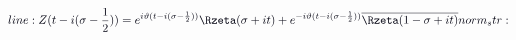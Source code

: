 \documentclass[12pt]{article}
\begin{document}
\makeatletter
\renewcommand*{\@textcolor}[3]{%
  \protect\leavevmode
  \begingroup
    \color#1{#2}#3%
  \endgroup
}
\makeatother
\begin{displaymath}
\mathcolor[RGB]{0,0,15}{line:
Z(t-i(\sigma-\frac12))=e^{i\vartheta(t-i(\sigma-\frac12))}\Rzeta(\sigma+it)+e^{-i\vartheta(t-i(\sigma-\frac12))}\overline{\Rzeta(1-\sigma+it)}

norm_str:}
\end{displaymath}
\end{document}
